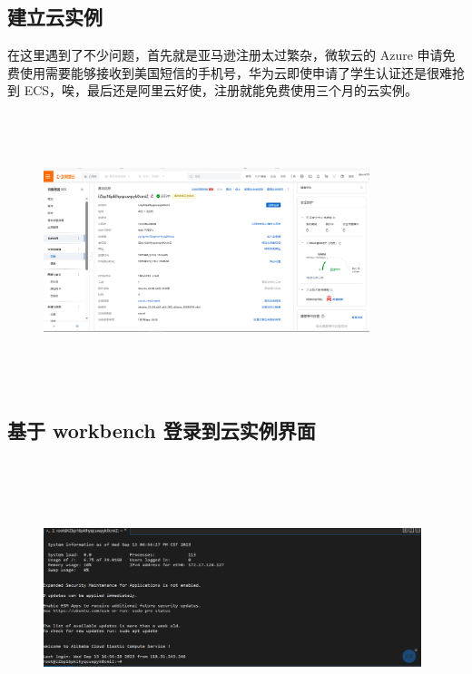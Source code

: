 \documentclass{article}
\begin{document}
\subsection*{建立云实例}
在这里遇到了不少问题，首先就是亚马逊注册太过繁杂，微软云的 Azure 申请免费使用需要能够接收到美国短信的手机号，华为云即使申请了学生认证还是很难抢到 ECS，唉，最后还是阿里云好使，注册就能免费使用三个月的云实例。
\begin{figure}[htbp]
    \centering
    \includegraphics[width=9.5cm,height=8cm]{阿里ESC.png}
\end{figure} 

\clearpage %

\subsection*{基于 workbench 登录到云实例界面}
\begin{figure}[htbp]
    \centering
    \includegraphics[width=11cm,height=8cm]{登录云实例.png}
\end{figure} 
\end{document}
